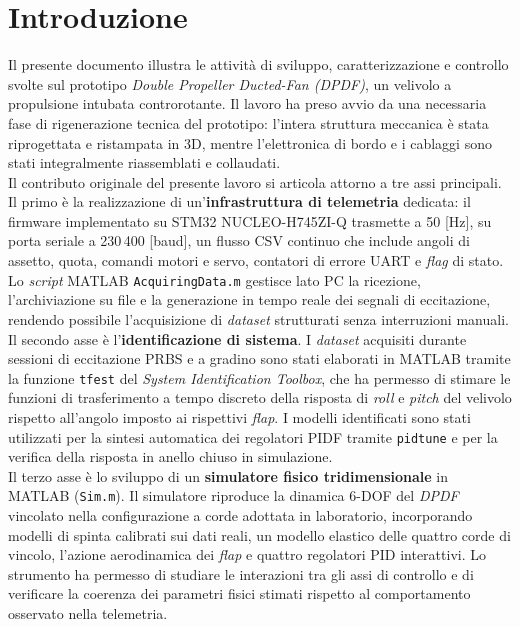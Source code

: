 \documentclass[11pt]{report}
\begin{document}
	\pagestyle{plain}
	
	\section*{Introduzione}
	
	Il presente documento illustra le attività di sviluppo, caratterizzazione e controllo svolte sul prototipo \textit{Double Propeller Ducted-Fan (DPDF)}, un velivolo a propulsione intubata controrotante. Il lavoro ha preso avvio da una necessaria fase di rigenerazione tecnica del prototipo: l'intera struttura meccanica è stata riprogettata e ristampata in 3D, mentre l'elettronica di bordo e i cablaggi sono stati integralmente riassemblati e collaudati.\\
	Il contributo originale del presente lavoro si articola attorno a tre assi principali. Il primo è la realizzazione di un'\textbf{infrastruttura di telemetria} dedicata: il firmware implementato su STM32 NUCLEO-H745ZI-Q trasmette a 50 [Hz], su porta seriale a 230\,400 [baud], un flusso CSV continuo che include angoli di assetto, quota, comandi motori e servo, contatori di errore UART e \textit{flag} di stato. Lo \textit{script} MATLAB \texttt{AcquiringData.m} gestisce lato PC la ricezione, l'archiviazione su file e la generazione in tempo reale dei segnali di eccitazione, rendendo possibile l'acquisizione di \textit{dataset} strutturati senza interruzioni manuali.\\
	Il secondo asse è l'\textbf{identificazione di sistema}. I \textit{dataset} acquisiti durante sessioni di eccitazione PRBS e a gradino sono stati elaborati in MATLAB tramite la funzione \texttt{tfest} del \textit{System Identification Toolbox}, che ha permesso di stimare le funzioni di trasferimento a tempo discreto della risposta di \textit{roll} e \textit{pitch} del velivolo rispetto all'angolo imposto ai rispettivi \textit{flap}. I modelli identificati sono stati utilizzati per la sintesi automatica dei regolatori PIDF tramite \texttt{pidtune} e per la verifica della risposta in anello chiuso in simulazione.\\
	Il terzo asse è lo sviluppo di un \textbf{simulatore fisico tridimensionale} in MATLAB (\texttt{Sim.m}). Il simulatore riproduce la dinamica 6-DOF del \textit{DPDF} vincolato nella configurazione a corde adottata in laboratorio, incorporando modelli di spinta calibrati sui dati reali, un modello elastico delle quattro corde di vincolo, l'azione aerodinamica dei \textit{flap} e quattro regolatori PID interattivi. Lo strumento ha permesso di studiare le interazioni tra gli assi di controllo e di verificare la coerenza dei parametri fisici stimati rispetto al comportamento osservato nella telemetria.\\
\end{document}
